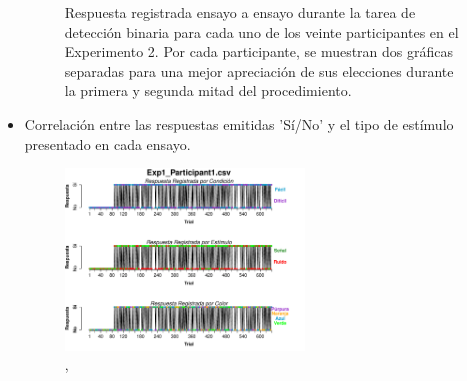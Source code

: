 \begin{itemize}
\begin{figure}[th]
\caption[Response_Exp2]{Respuesta registrada ensayo a ensayo durante la tarea de detección binaria para cada uno de los veinte participantes en el Experimento 2. Por cada participante, se muestran dos gráficas separadas para una mejor apreciación de sus elecciones durante la primera y segunda mitad del procedimiento.}
\label{fig:Response_E2}
\end{figure}


\item Correlación entre las respuestas emitidas 'Sí/No' y el tipo de estímulo presentado en cada ensayo.



\begin{figure}[th]
\centering
\includegraphics[width=0.60\textwidth]{Figures/BiasResp_Exp1_P1} 
\caption[ParticipanteSesgado_Variables]{,}
\label{fig:BiasResp_E1_P1}
\end{figure}




\end{itemize}
